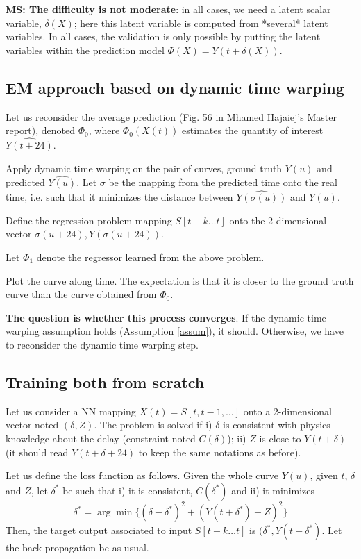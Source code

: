 \documentclass[]{article}
\theoremstyle{definition}
\begin{document}
\textbf{MS: The difficulty is not moderate}: in all cases, we need a latent scalar variable, $\delta(X)$; here this latent variable is computed from *several* latent variables. In all cases, the validation is only possible by putting the latent variables within the prediction model $\Phi(X) = Y(t + \delta(X))$. 

\subsection{EM approach based on dynamic time warping}\label{model3}

Let us reconsider the average prediction (Fig. 56 in Mhamed Hajaiej's Master report), denoted $\Phi_0$, where $\Phi_0(X(t))$ estimates the quantity of interest $\widehat{Y(t+24)}$. 

Apply dynamic time warping on the pair of curves, ground truth $Y(u)$ and predicted $\widehat{Y(u)}$. Let $\sigma$ be the mapping from the predicted time onto the real time, i.e. such that it minimizes the distance between $\widehat{Y(\sigma(u))}$ and $Y(u)$. 

Define the regression problem mapping $S[t-k \ldots t]$ onto the 2-dimensional vector $\sigma(u+24), Y(\sigma(u+24))$. 

Let $\Phi_1$ denote the regressor learned from the above problem. 

Plot the curve along time. The expectation is that it is closer to the ground truth curve than the curve obtained from $\Phi_0$. 

\textbf{The question is whether this process converges}. If the dynamic time warping assumption holds (Assumption \ref{assum}), it should. Otherwise, we have to reconsider the dynamic time warping step.

\subsection{Training both from scratch}\label{model4}

Let us consider a NN mapping $X(t) = S[t, t-1, \ldots]$ onto a 2-dimensional vector noted $(\delta, Z)$. 
The problem is solved if i) $\delta$ is consistent with physics knowledge about the delay (constraint noted $C(\delta)$); ii) $Z$ is close to $Y(t+\delta)$ (it should read $Y(t+\delta+24)$ to keep the same notations as before).

Let us define the loss function as follows. Given the whole curve $Y(u)$, given $t$, $\delta$ and $Z$, let $\delta^*$ be such that i) it is consistent, $C(\delta^*)$ and ii) it minimizes
\[ \delta^* = \arg \min \{ (\delta - \delta^*)^2 + (Y(t + \delta^*) - Z)^2 \}
 \]
Then, the target output associated to input $S[t-k \ldots t]$ is $(\delta^*, Y(t + \delta^*)$. 
Let the back-propagation be as usual. 
\end{document}

